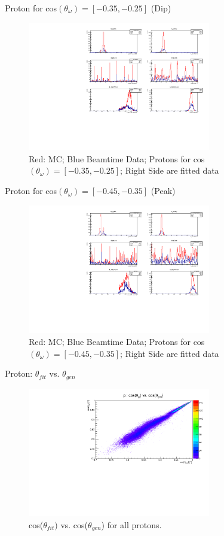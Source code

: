 \documentclass[
		10pt
		]{beamer}
\begin{document}
\begin{frame}{Proton for cos$(\theta_{\omega})=[-0.35,-0.25]$ (Dip)}
	\begin{figure}
		\includegraphics[width=8cm]{Plots/Data-vs-Mc/Cut-325/Proton.pdf}
		\caption{Red: MC; Blue Beamtime Data; Protons for cos$(\theta_{\omega})=[-0.35,-0.25]$; Right Side are fitted data}
	\end{figure}
	
\end{frame}



\begin{frame}{Proton for cos$(\theta_{\omega})=[-0.45,-0.35]$ (Peak)}
	\begin{figure}
		\includegraphics[width=8cm]{Plots/Data-vs-Mc/Cut-475/Proton.pdf}
		\caption{Red: MC; Blue Beamtime Data; Protons for cos$(\theta_{\omega})=[-0.45,-0.35]$; Right Side are fitted data}
	\end{figure}
	
\end{frame}

\begin{frame}{Proton: $\theta_{fit}$ vs. $\theta_{gen}$}
	\begin{figure}
		\includegraphics[width=8cm]{Plots/MC/1/ThetaTheta1Proton.pdf}
		\caption{cos($\theta_{fit})$ vs. cos($\theta_{gen}$) for all protons.}
	\end{figure}
\end{frame}
\end{document}

